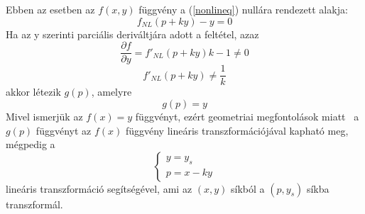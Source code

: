 Ebben az esetben az $f(x,y)$ függvény a (\ref{nonlineq}) nullára rendezett alakja:
\begin{equation}
    f_{NL}(p+ky)-y=0
\end{equation}
Ha az y szerinti parciális deriváltjára adott a feltétel, azaz
\begin{equation}
    \frac{\partial{f}}{\partial{y}}=f'_{NL}(p+ky)k-1 \neq 0
\end{equation}
\begin{equation}
    f'_{NL}(p+ky) \neq \frac{1}{k}
\end{equation}
akkor létezik $g(p)$, amelyre
\begin{equation}
    g(p)=y
\end{equation}
Mivel ismerjük az $f(x)=y$ függvényt, ezért geometriai megfontolások 
miatt~\cite{borin} a $g(p)$ függvényt az $f(x)$ függvény lineáris transzformációjával 
kapható meg, mégpedig a
\begin{equation}
    \begin{cases}
        y=y_s \\
        p=x-ky
    \end{cases}
\end{equation}
lineáris transzformáció segítségével, ami az $(x,y)$ síkból a $(p,y_s)$ síkba transzformál.

